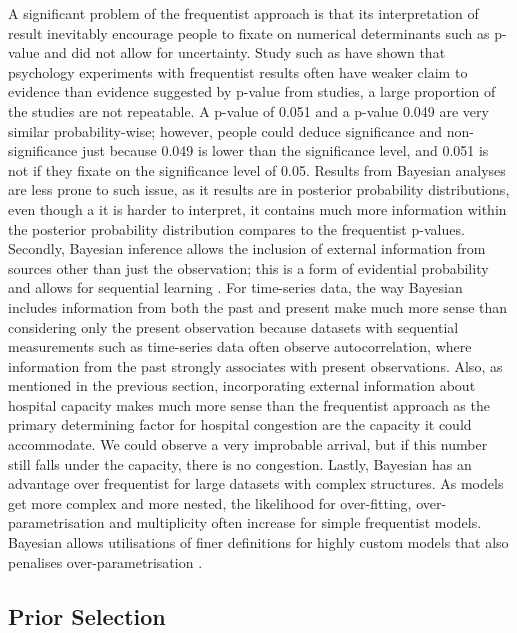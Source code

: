 A significant problem of the frequentist approach is that its interpretation of result inevitably encourage people to fixate on numerical determinants such as p-value and did not allow for uncertainty. Study such as \citet{open2015estimating} have shown that psychology experiments with frequentist results often have weaker claim to evidence than evidence suggested by p-value from studies, a large proportion of the studies are not repeatable. A p-value of 0.051 and a p-value 0.049 are very similar probability-wise; however, people could deduce significance and non-significance just because 0.049 is lower than the significance level, and 0.051 is not if they fixate on the significance level of 0.05.  Results from Bayesian analyses are less prone to such issue, as it results are in posterior probability distributions, even though a it is harder to interpret, it contains much more information within the posterior probability distribution compares to the frequentist p-values. Secondly, Bayesian inference allows the inclusion of external information from sources other than just the observation; this is a form of evidential probability and allows for sequential learning \citep{baath2015, Jia2018}. For time-series data, the way Bayesian includes information from both the past and present make much more sense than considering only the present observation because datasets with sequential measurements such as time-series data often observe autocorrelation, where information from the past strongly associates with present observations. Also, as mentioned in the previous section, incorporating external information about hospital capacity makes much more sense than the frequentist approach as the primary determining factor for hospital congestion are the capacity it could accommodate. We could observe a very improbable arrival, but if this number still falls under the capacity, there is no congestion. Lastly, Bayesian has an advantage over frequentist for large datasets with complex structures. As models get more complex and more nested, the likelihood for over-fitting, over-parametrisation and multiplicity often increase for simple frequentist models. Bayesian allows utilisations of finer definitions for highly custom models that also penalises over-parametrisation \citep{baath2015, bolker2009generalized, kruschke2015bayesian}.

\subsection{Prior Selection}

